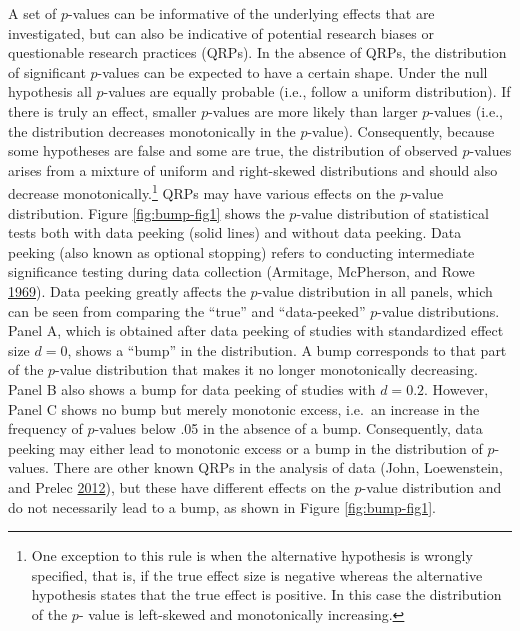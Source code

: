 \documentclass[a5paper]{book}
\let\rmarkdownfootnote\footnote%
\def\footnote{\protect\rmarkdownfootnote}
\begin{document}
A set of \(p\)-values can be informative of the underlying effects that
are investigated, but can also be indicative of potential research
biases or questionable research practices (QRPs). In the absence of
QRPs, the distribution of significant \(p\)-values can be expected to
have a certain shape. Under the null hypothesis all \(p\)-values are
equally probable (i.e., follow a uniform distribution). If there is
truly an effect, smaller \(p\)-values are more likely than larger
\(p\)-values (i.e., the distribution decreases monotonically in the
\(p\)-value). Consequently, because some hypotheses are false and some
are true, the distribution of observed \(p\)-values arises from a
mixture of uniform and right-skewed distributions and should also
decrease monotonically.\footnote{One exception to this rule is when the
  alternative hypothesis is wrongly specified, that is, if the true
  effect size is negative whereas the alternative hypothesis states that
  the true effect is positive. In this case the distribution of the
  \(p\)- value is left-skewed and monotonically increasing.} QRPs may
have various effects on the \(p\)-value distribution. Figure
\ref{fig:bump-fig1} shows the \(p\)-value distribution of statistical
tests both with data peeking (solid lines) and without data peeking.
Data peeking (also known as optional stopping) refers to conducting
intermediate significance testing during data collection (Armitage,
McPherson, and Rowe
\protect\hyperlink{ref-doi:10.2307ux2f2343787}{1969}). Data peeking
greatly affects the \(p\)-value distribution in all panels, which can be
seen from comparing the \enquote{true} and \enquote{data-peeked}
\(p\)-value distributions. Panel A, which is obtained after data peeking
of studies with standardized effect size \(d=0\), shows a \enquote{bump}
in the distribution. A bump corresponds to that part of the \(p\)-value
distribution that makes it no longer monotonically decreasing. Panel B
also shows a bump for data peeking of studies with \(d=0.2\). However,
Panel C shows no bump but merely monotonic excess, i.e.~an increase in
the frequency of \(p\)-values below .05 in the absence of a bump.
Consequently, data peeking may either lead to monotonic excess or a bump
in the distribution of \(p\)-values. There are other known QRPs in the
analysis of data (John, Loewenstein, and Prelec
\protect\hyperlink{ref-doi:10.1177ux2f0956797611430953}{2012}), but
these have different effects on the \(p\)-value distribution and do not
necessarily lead to a bump, as shown in Figure \ref{fig:bump-fig1}.
\end{document}
